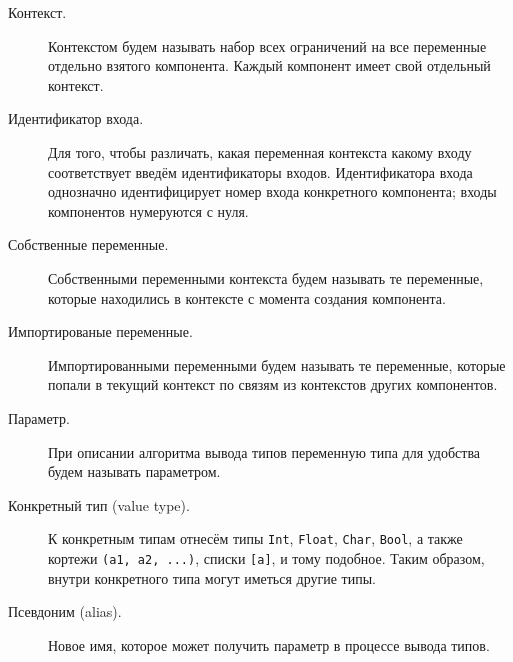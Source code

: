 \begin{description}
	\item[Контекст.] Контекстом будем называть набор всех ограничений на все переменные отдельно взятого компонента. Каждый компонент имеет свой отдельный контекст.
	\item[Идентификатор входа.] Для того, чтобы различать, какая переменная контекста какому входу соответствует введём идентификаторы входов. Идентификатора входа однозначно идентифицирует номер входа конкретного компонента; входы компонентов нумеруются с нуля.
	\item[Собственные переменные.] Собственными переменными контекста будем называть те переменные, которые находились в контексте с момента создания компонента.
	\item[Импортированые переменные.] Импортированными переменными будем называть те переменные, которые попали в текущий контекст по связям из контекстов других компонентов.
	\item[Параметр.] При описании алгоритма вывода типов переменную типа для удобства будем называть параметром.
	\item[Конкретный тип (value type).] К конкретным типам отнесём типы \lstinline|Int|, \lstinline|Float|, \lstinline|Char|, \lstinline|Bool|, а также кортежи \lstinline|(a1, a2, ...)|, списки \lstinline|[a]|, и тому подобное. Таким образом, внутри конкретного типа могут иметься другие типы.
	\item[Псевдоним (alias).] Новое имя, которое может получить параметр в процессе вывода типов.
\end{description}


